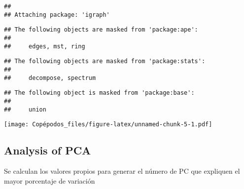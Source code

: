 \documentclass[]{article}
\newenvironment{Shaded}{\begin{snugshade}}{\end{snugshade}}
\newcommand{\DataTypeTok}[1]{\textcolor[rgb]{0.13,0.29,0.53}{#1}}
\newcommand{\DecValTok}[1]{\textcolor[rgb]{0.00,0.00,0.81}{#1}}
\newcommand{\KeywordTok}[1]{\textcolor[rgb]{0.13,0.29,0.53}{\textbf{#1}}}
\newcommand{\NormalTok}[1]{#1}
\newcommand{\OperatorTok}[1]{\textcolor[rgb]{0.81,0.36,0.00}{\textbf{#1}}}
\newcommand{\OtherTok}[1]{\textcolor[rgb]{0.56,0.35,0.01}{#1}}
\newcommand{\StringTok}[1]{\textcolor[rgb]{0.31,0.60,0.02}{#1}}
\begin{document}
\begin{verbatim}
## 
## Attaching package: 'igraph'
\end{verbatim}

\begin{verbatim}
## The following objects are masked from 'package:ape':
## 
##     edges, mst, ring
\end{verbatim}

\begin{verbatim}
## The following objects are masked from 'package:stats':
## 
##     decompose, spectrum
\end{verbatim}

\begin{verbatim}
## The following object is masked from 'package:base':
## 
##     union
\end{verbatim}

\begin{Shaded}
\end{Shaded}

\texttt{[image: Copépodos\_files/figure-latex/unnamed-chunk-5-1.pdf]}

\hypertarget{analysis-of-pca}{%
\subsection{Analysis of PCA}\label{analysis-of-pca}}

Se calculan los valores propios para generar el número de PC que
expliquen el mayor porcentaje de variación
\end{document}
